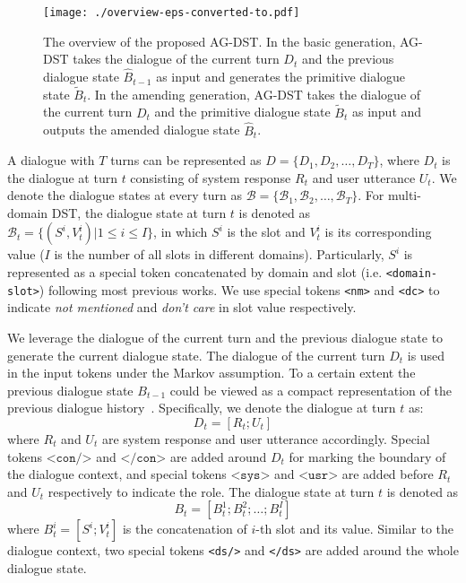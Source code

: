 \documentclass[11pt]{article}
\begin{document}
\begin{figure*}
	\centering
	\texttt{[image: ./overview-eps-converted-to.pdf]}
	\caption{The overview of the proposed AG-DST. In the basic generation, AG-DST takes the dialogue of the current turn $D_t$ and the previous dialogue state $\hat{B}_{t-1}$ as input and generates the primitive dialogue state $\tilde{B}_t$. In the amending generation, AG-DST takes the dialogue of the current turn $D_t$ and the primitive dialogue state $\tilde{B}_t$ as input and outputs the amended dialogue state $\hat{B}_t$.}
	\label{fig:overview}
\end{figure*}

A dialogue with $T$ turns can be represented as $D=\{D_1,D_2,\dots,D_T\}$, where $D_t$ is the dialogue at turn $t$ consisting of system response $R_t$ and user utterance $U_t$. We denote the dialogue states at every turn as $\mathcal{B}=\{\mathcal{B}_1,\mathcal{B}_2,\dots,\mathcal{B}_T\}$. For multi-domain DST, the dialogue state at turn $t$ is denoted as $\mathcal{B}_t=\{(S^i,V_t^i)|1\leq i\leq I\}$, in which $S^i$ is the slot and $V_t^i$ is its corresponding value ($I$ is the number of all slots in different domains). Particularly, $S^i$ is represented as a special token concatenated by domain and slot (i.e. \texttt{<domain-slot>}) following most previous works. We use special tokens \texttt{<nm>} and \texttt{<dc>} to indicate \textit{not mentioned} and \textit{don't care} in slot value respectively.


We leverage the dialogue of the current turn and the previous dialogue state to generate the current dialogue state. The dialogue of the current turn $D_t$ is used in the input tokens under the Markov assumption. To a certain extent the previous dialogue state $B_{t-1}$ could be viewed as a compact representation of the previous dialogue history~\citep{kim-etal-2020-efficient}. Specifically, we denote the dialogue at turn $t$ as:
\begin{equation}
    D_t=[R_t;U_t]
\end{equation}
where $R_t$ and $U_t$ are system response and user utterance accordingly. Special tokens $\texttt{<con/>}$ and $\texttt{</con>}$ are added around $D_t$ for marking the boundary of the dialogue context, and special tokens $\texttt{<sys>}$ and $\texttt{<usr>}$ are added before $R_t$ and $U_t$ respectively to indicate the role. The dialogue state at turn $t$ is denoted as
\begin{equation}
    B_t=[B_t^1;B_t^2;\dots;B_t^I]
\end{equation}
where $B_t^i=[S^i;V_t^i]$ is the concatenation of $i$-th slot and its value. Similar to the dialogue context, two special tokens \texttt{<ds/>} and \texttt{</ds>} are added around the whole dialogue state. 
\end{document}
